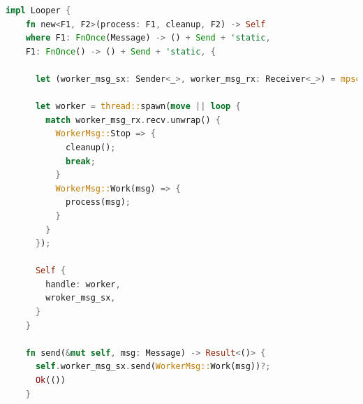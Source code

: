 \documentclass[12pt]{article}
\begin{document}
\begin{itemize}
\begin{lstlisting}[language=rust]
impl Looper {
    fn new<F1, F2>(process: F1, cleanup, F2) -> Self
    where F1: FnOnce(Message) -> () + Send + 'static,
    F1: FnOnce() -> () + Send + 'static, {

      let (worker_msg_sx: Sender<_>, worker_msg_rx: Receiver<_>) = mpsc::channel();

      let worker = thread::spawn(move || loop {
        match worker_msg_rx.recv.unwrap() {
          WorkerMsg::Stop => {
            cleanup();
            break;
          }
          WorkerMsg::Work(msg) => {
            process(msg);
          }
        }
      });
      
      Self {
        handle: worker,
        wroker_msg_sx,
      }
    }

    fn send(&mut self, msg: Message) -> Result<()> {
      self.worker_msg_sx.send(WorkerMsg::Work(msg))?;
      Ok(())
    }


\end{lstlisting}
\end{itemize}
\end{document}
